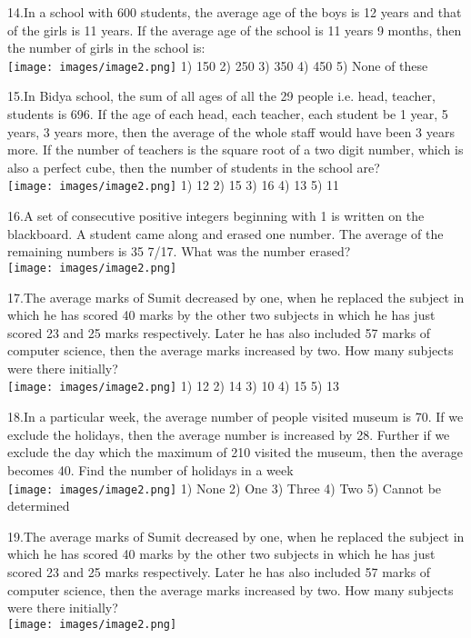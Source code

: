 \documentclass[
]{article}
\begin{document}
14.In a school with 600 students, the average age of the boys is 12 years and that of the girls is 11 years. If the average age of the school is 11 years 9 months, then the number of girls in the school is:   \\
\texttt{[image: images/image2.png]}   1) 150 	2) 250 	3) 350 	4) 450 	5) None of these

15.In Bidya school, the sum of all ages of all the 29 people i.e. head, teacher, students is 696. If the age of each head, each teacher, each student be 1 year, 5 years, 3 years more, then the average of the whole staff would have been 3 years more. If the number of teachers is the square root of a two digit number, which is also a perfect cube, then the number of students in the school are?   \\
\texttt{[image: images/image2.png]}   1) 12 	2) 15 	3) 16 	4) 13 	5) 11

16.A set of consecutive positive integers beginning with 1 is written on the blackboard. A student came along and erased one number. The average of the remaining numbers is 35 7/17. What was the number erased?  \\
\texttt{[image: images/image2.png]}   

17.The average marks of Sumit decreased by one, when he replaced the subject in which he has scored 40 marks by the other two subjects in which he has just scored 23 and 25 marks respectively. Later he has also included 57 marks of computer science, then the average marks increased by two. How many subjects were there initially?   \\
\texttt{[image: images/image2.png]}   1) 12 	2) 14 	3) 10 	4) 15 	5) 13

18.In a particular week, the average number of people visited museum is 70. If we exclude the holidays, then the average number is increased by 28. Further if we exclude the day which the maximum of 210 visited the museum, then the average becomes 40. Find the number of holidays in a week   \\
\texttt{[image: images/image2.png]}   1) None 	2) One 	3) Three 	4) Two 	5) Cannot be determined

19.The average marks of Sumit decreased by one, when he replaced the subject in which he has scored 40 marks by the other two subjects in which he has just scored 23 and 25 marks respectively. Later he has also included 57 marks of computer science, then the average marks increased by two. How many subjects were there initially?   \\
\texttt{[image: images/image2.png]}   
\end{document}
